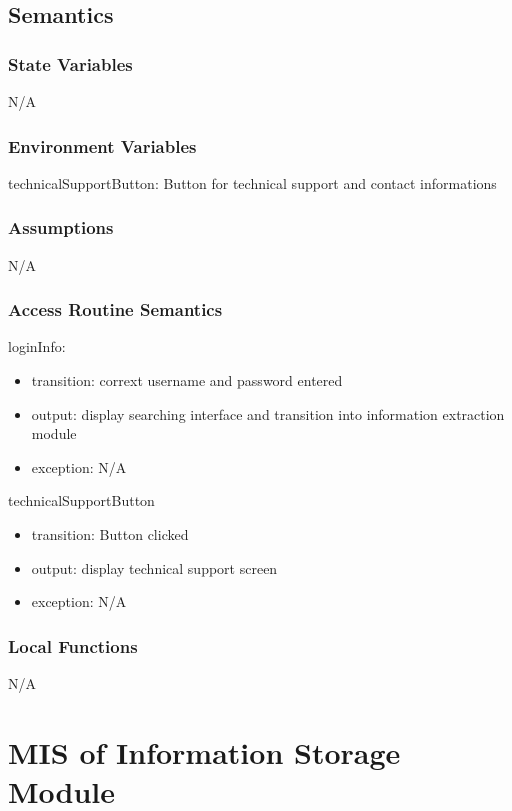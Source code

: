 \documentclass[12pt, titlepage]{article}
\begin{document}
\subsection{Semantics}

\subsubsection{State Variables}
N/A


\subsubsection{Environment Variables}
technicalSupportButton: Button for technical support and contact informations



\subsubsection{Assumptions}

N/A

\subsubsection{Access Routine Semantics}

\noindent loginInfo:
\begin{itemize} 
\item transition: corrext username and password entered 
\item output: display searching interface and transition into information extraction module
\item exception: N/A 
\end{itemize}
\noindent technicalSupportButton 
\begin{itemize} 
\item transition: Button clicked
\item output: display technical support screen
\item exception: N/A 
\end{itemize}



\subsubsection{Local Functions}

N/A

\newpage



\section{MIS of Information Storage Module} 
\end{document}
